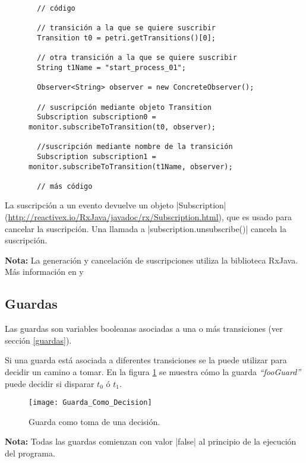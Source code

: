 \begin{figure}[H]
\centering
\begin{verbatim}
  // código
  
  // transición a la que se quiere suscribir
  Transition t0 = petri.getTransitions()[0]; 
  
  // otra transición a la que se quiere suscribir
  String t1Name = "start_process_01";
  
  Observer<String> observer = new ConcreteObserver();
  
  // suscripción mediante objeto Transition
  Subscription subscription0 = monitor.subscribeToTransition(t0, observer);
  
  //suscripción mediante nombre de la transición
  Subscription subscription1 = monitor.subscribeToTransition(t1Name, observer);
  
  // más código
\end{verbatim}
\end{figure}

La suscripción a un evento devuelve un objeto |Subscription|
(\url{http://reactivex.io/RxJava/javadoc/rx/Subscription.html}),
que es usado para cancelar la suscripción.
Una llamada a |subscription.unsubscribe()| cancela la suscripción.

\begin{framed}
\textbf{Nota:} La generación y cancelación de suscripciones utiliza la
biblioteca RxJava. Más información en \cite{RxJava} y \cite{RxJavaJavadoc}
\end{framed}

\subsection{Guardas}
\label{sec:guardas_monitor}
Las guardas son variables booleanas asociadas a una o más transiciones (ver
sección \ref{guardas}).

Si una guarda está asociada a diferentes transiciones se la puede utilizar para
decidir un camino a tomar. En la figura \ref{fig:guarda_como_decision} se
muestra cómo la guarda \textit{``fooGuard''} puede decidir si disparar $t_{0}$ ó
$t_{1}$.

\begin{figure}[H]
  \centering
  \texttt{[image: Guarda\_Como\_Decision]}
  \caption{Guarda como toma de una decisión.}
  \label{fig:guarda_como_decision}
\end{figure}

\begin{framed}
\textbf{Nota:} Todas las guardas comienzan con valor |false| al
principio de la ejecución del programa.
\end{framed}

